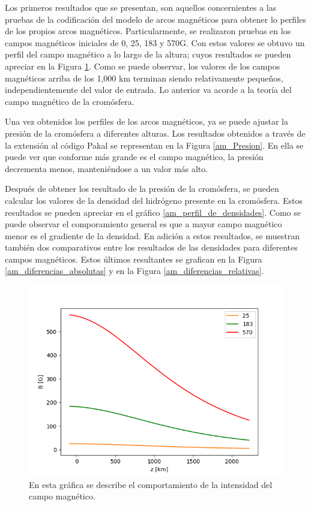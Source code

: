 \documentclass[9pt]{book}
\begin{document}
Los primeros resultados que se presentan, son aquellos concernientes a las pruebas de la codificaci\'on del modelo de arcos magn\'eticos para obtener lo perfiles de los propios arcos magn\'eticos. Particularmente, se realizaron pruebas en los campos magn\'eticos iniciales de 0, 25, 183 y 570G. Con estos valores se obtuvo un perfil del campo magn\'etico a lo largo de la altura; cuyos resultados se pueden apreciar en la Figura \ref{am_Campo_Magnetico}. Como se puede observar, los valores de los campos magn\'eticos arriba de los 1,000 km terminan siendo relativamente peque\~nos, independientemente del valor de entrada. Lo anterior va acorde a la teor\'ia del campo magn\'etico de la crom\'osfera.

Una vez obtenidos los perfiles de los arcos magn\'eticos, ya se puede ajustar la presi\'on de la crom\'osfera a diferentes alturas. Los resultados obtenidos a trav\'es de la extensi\'on al c\'odigo Pakal se representan en la Figura \ref{am_Presion}. En ella se puede ver que conforme m\'as grande es el campo magn\'etico, la presi\'on decrementa menos, manteni\'endose a un valor m\'as alto. 

Despu\'es de obtener los resultado de la presi\'on de la crom\'osfera, se pueden calcular los valores de la densidad del hidr\'ogeno presente en la crom\'osfera. Estos resultados se pueden apreciar en el gr\'afico \ref{am_perfil_de_densidades}. Como se puede observar el comporamiento general es que a mayor campo magn\'etico menor es el gradiente de la densidad. En adici\'on a estos resultados, se muestran tambi\'en dos comparativos entre los resultados de las densidades para diferentes campos magn\'eticos. Estos \'ultimos resultantes se grafican en la Figura \ref{am_diferencias_absolutas} y en la Figura \ref{am_diferencias_relativas}.

\newpage
\begin{figure}[h]
\centering
\includegraphics[scale=1]{am_Campo_Magnetico}
\caption{ En esta gr\'afica se describe el comportamiento de la intensidad del campo magn\'etico. }
\label{am_Campo_Magnetico}
\end{figure}
\end{document}
